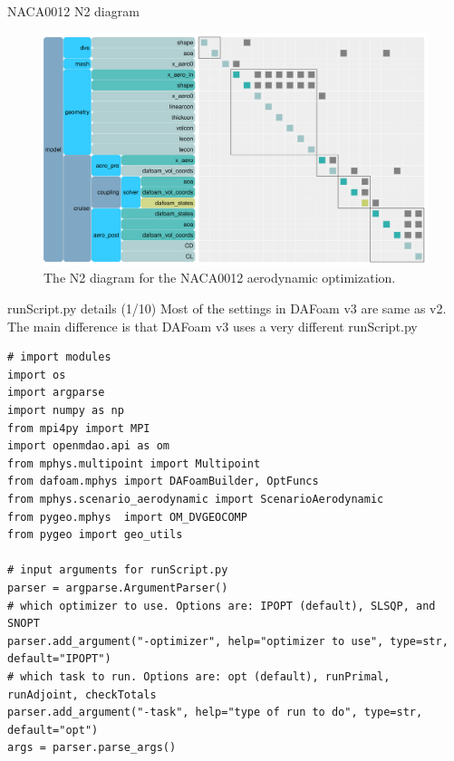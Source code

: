 \documentclass{bredelebeamer}
\begin{document}
\begin{frame}[fragile]{NACA0012 N2 diagram}

  \begin{figure}
    \includegraphics[width=\linewidth]{images/naca0012_n2.pdf} 
    \caption{The N2 diagram for the NACA0012 aerodynamic optimization.}
  \end{figure}

\end{frame}


\begin{frame}[fragile]{runScript.py details (1/10)}
Most of the settings in DAFoam v3 are same as v2. The main difference is that DAFoam v3 uses a very different runScript.py
  \footnotesize
  \lstset{ language=bash }
  \begin{lstlisting}
# import modules
import os
import argparse
import numpy as np
from mpi4py import MPI
import openmdao.api as om
from mphys.multipoint import Multipoint
from dafoam.mphys import DAFoamBuilder, OptFuncs
from mphys.scenario_aerodynamic import ScenarioAerodynamic
from pygeo.mphys  import OM_DVGEOCOMP
from pygeo import geo_utils
    
# input arguments for runScript.py    
parser = argparse.ArgumentParser()
# which optimizer to use. Options are: IPOPT (default), SLSQP, and SNOPT
parser.add_argument("-optimizer", help="optimizer to use", type=str, default="IPOPT")
# which task to run. Options are: opt (default), runPrimal, runAdjoint, checkTotals
parser.add_argument("-task", help="type of run to do", type=str, default="opt")
args = parser.parse_args()
  \end{lstlisting}
  \normalsize

\end{frame}
\end{document}
